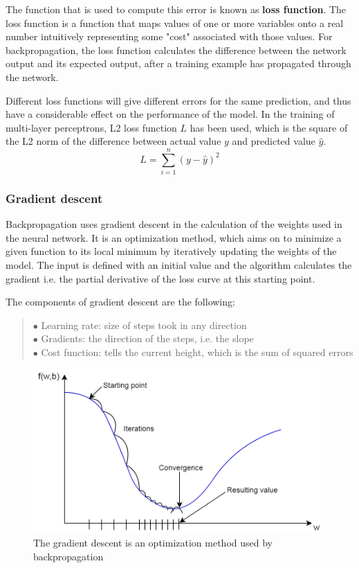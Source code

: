 The function that is used to compute this error is known as \textbf{loss function}. The loss function is a function that maps values of one or more variables onto a real number intuitively representing some "cost" associated with those values. For backpropagation, the loss function calculates the difference between the network output and its expected output, after a training example has propagated through the network. \smallskip

Different loss functions will give different errors for the same prediction, and thus have a considerable effect on the performance of the model. In the training of multi-layer perceptrons, L2 loss function $L$ has been used, which is the square of the L2 norm of the difference between actual value $y$ and predicted value $\hat{y}$.
$$ L = \sum^n_{i=1}(y - \hat{y})^2 $$



\subsubsection{Gradient descent}

Backpropagation uses gradient descent in the calculation of the weights used in the neural network. It is an optimization method, which aims on to minimize a given function to its local minimum by iteratively updating the weights of the model. The input is defined with an initial value and the algorithm calculates the gradient i.e. the partial derivative of the loss curve at this starting point. \smallskip

\noindent The components of gradient descent are the following:
\begin{verse}
	$\bullet$ Learning rate: size of steps took in any direction\\
	$\bullet$ Gradients: the direction of the steps, i.e. the slope\\
	$\bullet$ Cost function: tells the current height, which is the sum of squared errors
\end{verse}

\begin{figure}[h]
	\centering
	\includegraphics[height=0.35\linewidth]{./figures/gradient}
	\caption{The gradient descent is an optimization method used by backpropagation}
	\label{fig:gradient}
\end{figure}

